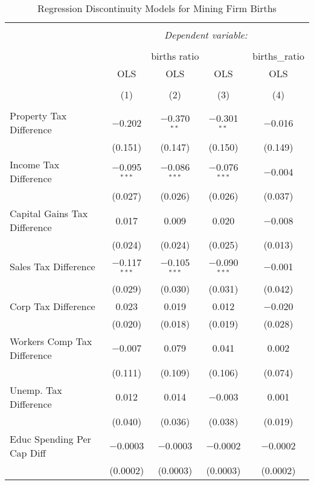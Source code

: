 
\begin{table}[!htbp] \centering 
  \caption{Regression Discontinuity Models for  Mining Firm Births} 
  \label{21rd} 
\begin{tabular}{@{\extracolsep{5pt}}lcccc} 
\\[-1.8ex]\hline 
\hline \\[-1.8ex] 
 & \multicolumn{4}{c}{\textit{Dependent variable:}} \\ 
\cline{2-5} 
\\[-1.8ex] & \multicolumn{3}{c}{births ratio} & births\_ratio \\ 
 & OLS & OLS & OLS & OLS \\ 
\\[-1.8ex] & (1) & (2) & (3) & (4)\\ 
\hline \\[-1.8ex] 
 Property Tax Difference & $-$0.202 & $-$0.370$^{**}$ & $-$0.301$^{**}$ & $-$0.016 \\ 
  & (0.151) & (0.147) & (0.150) & (0.149) \\ 
  Income Tax Difference & $-$0.095$^{***}$ & $-$0.086$^{***}$ & $-$0.076$^{***}$ & $-$0.004 \\ 
  & (0.027) & (0.026) & (0.026) & (0.037) \\ 
  Capital Gains Tax Difference & 0.017 & 0.009 & 0.020 & $-$0.008 \\ 
  & (0.024) & (0.024) & (0.025) & (0.013) \\ 
  Sales Tax Difference & $-$0.117$^{***}$ & $-$0.105$^{***}$ & $-$0.090$^{***}$ & $-$0.001 \\ 
  & (0.029) & (0.030) & (0.031) & (0.042) \\ 
  Corp Tax Difference & 0.023 & 0.019 & 0.012 & $-$0.020 \\ 
  & (0.020) & (0.018) & (0.019) & (0.028) \\ 
  Workers Comp Tax Difference & $-$0.007 & 0.079 & 0.041 & 0.002 \\ 
  & (0.111) & (0.109) & (0.106) & (0.074) \\ 
  Unemp. Tax Difference & 0.012 & 0.014 & $-$0.003 & 0.001 \\ 
  & (0.040) & (0.036) & (0.038) & (0.019) \\ 
  Educ Spending Per Cap Diff & $-$0.0003 & $-$0.0003 & $-$0.0002 & $-$0.0002 \\ 
  & (0.0002) & (0.0003) & (0.0003) & (0.0002) \\ 

\end{tabular}
\end{table}
